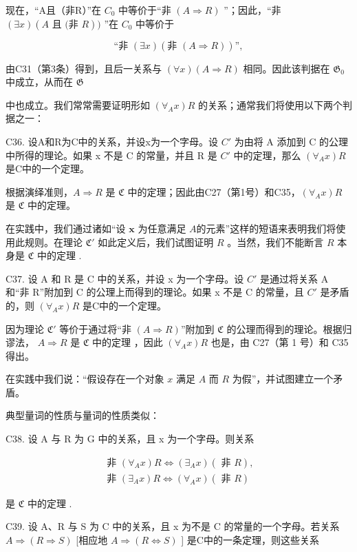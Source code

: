 现在，“A且（非R）”在 \(C_{0}\) 中等价于“非 \((A \Longrightarrow R)\) ”；因此，“非 \((\exists x)(A \text{ 且 (非 } R))\) ”在 \(C_{0}\) 中等价于

\[
\text{``非 } (\exists x) (\text{非 } (A \Rightarrow R))\text{''},
\]

由C31（第3条）得到，且后一关系与 \((\forall x)(A \Rightarrow R)\) 相同。因此该判据在 \(\mathfrak{G}_0\) 中成立，从而在 \(\mathfrak{G}\)

中也成立。我们常常需要证明形如 \((\forall_{A}x)R\) 的关系；通常我们将使用以下两个判据之一：

C36. 设A和R为C中的关系，并设x为一个字母。设 \(C'\) 为由将 A 添加到 C 的公理中所得的理论。如果 x 不是 C 的常量，并且 R 是 \(C'\) 中的定理，那么 \((\forall_{A}x)R\) 是C中的一个定理。

根据演绎准则，\(A \Longrightarrow R\) 是 \(\mathfrak{C}\) 中的定理；因此由C27（第1号）和C35，\((\forall_A x) R\) 是 \(\mathfrak{C}\) 中的定理。

在实践中，我们通过诸如“设 \(\pmb{x}\) 为任意满足 \(A\)的元素”这样的短语来表明我们将使用此规则。在理论 \(\mathfrak{C}'\) 如此定义后，我们试图证明 \(R\) 。当然，我们不能断言 \(R\) 本身是 \(\mathfrak{C}\) 中的定理 .

C37. 设 A 和 R 是 C 中的关系，并设 x 为一个字母。设 \(C'\) 是通过将关系 A 和“非 R”附加到 C 的公理上而得到的理论。如果 x 不是 C 的常量，且 \(C'\) 是矛盾的，则 \((\forall_{A}x)R\) 是C中的一个定理。

因为理论 \(\mathfrak{C}'\) 等价于通过将“非 \((A \Longrightarrow R)\)”附加到 \(\mathfrak{C}\) 的公理而得到的理论。根据归谬法， \(A \Longrightarrow R\) 是 \(\mathfrak{C}\) 中的定理 ，因此 \((\forall_A x)R\) 也是，由 C27（第 1 号）和 C35 得出。

在实践中我们说：“假设存在一个对象 \(x\) 满足 \(A\) 而 \(R\) 为假”，并试图建立一个矛盾。

典型量词的性质与量词的性质类似：

C38. 设 A 与 R 为 G 中的关系，且 x 为一个字母。则关系

\[
\begin{array}{l} \text { 非 } (\forall_ {A} x) R \Longleftrightarrow (\exists_ {A} x) (\text { 非 } R), \\ \text { 非 } (\exists_ {A} x) R \Longleftrightarrow (\forall_ {A} x) (\text { 非 } R) \end{array}
\]

是 \(\mathfrak{C}\) 中的定理 .

C39. 设 A、R 与 S 为 C 中的关系，且 x 为不是 C 的常量的一个字母。若关系 \(A \Longrightarrow (R \Longrightarrow S)\) {[}相应地 \(A \Longrightarrow (R \Longleftrightarrow S)\) {]} 是C中的一条定理，则这些关系

